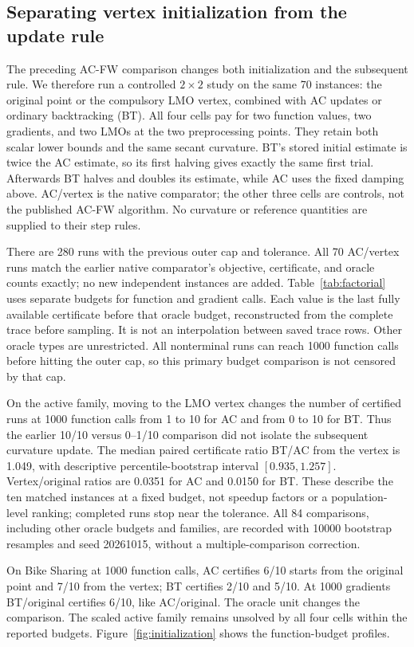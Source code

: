 \subsection{Separating vertex initialization from the update rule}
The preceding AC-FW comparison changes both initialization and the
subsequent rule. We therefore run a controlled $2\times2$ study on the
same 70 instances: the original point or the compulsory LMO vertex,
combined with AC updates or ordinary backtracking (BT). All four cells
pay for two function values, two gradients, and two LMOs at the two
preprocessing points. They retain both scalar lower bounds and the same
secant curvature. BT's stored initial estimate is twice the AC estimate,
so its first halving gives exactly the same first trial. Afterwards BT
halves and doubles its estimate, while AC uses the fixed damping above.
AC/vertex is the native comparator; the other three cells are controls,
not the published AC-FW algorithm. No curvature or reference quantities
are supplied to their step rules.

There are 280 runs with the previous outer cap and tolerance. All 70
AC/vertex runs match the earlier native comparator's objective,
certificate, and oracle counts exactly; no new independent instances
are added. Table~\ref{tab:factorial} uses separate budgets for function
and gradient calls. Each value is the last fully available certificate
before that oracle budget, reconstructed from the complete trace before
sampling. It is not an interpolation between saved trace rows. Other
oracle types are unrestricted. All nonterminal runs can reach 1000
function calls before hitting the outer cap, so this primary budget
comparison is not censored by that cap.

On the active family, moving to the LMO vertex changes the number of
certified runs at 1000 function calls from 1 to 10 for AC and from 0 to
10 for BT. Thus the earlier 10/10 versus 0--1/10 comparison did not
isolate the subsequent curvature update. The median paired certificate
ratio BT/AC from the vertex is 1.049, with descriptive percentile-bootstrap
interval $[0.935,1.257]$. Vertex/original ratios are 0.0351 for AC and
0.0150 for BT. These describe the ten matched instances at a fixed
budget, not speedup factors or a population-level ranking; completed
runs stop near the tolerance. All 84 comparisons, including other
oracle budgets and families, are recorded with 10000 bootstrap resamples
and seed 20261015, without a multiple-comparison correction.

On Bike Sharing at 1000 function calls, AC certifies 6/10 starts from the
original point and 7/10 from the vertex; BT certifies 2/10 and 5/10.
At 1000 gradients BT/original certifies 6/10, like AC/original. The oracle
unit changes the comparison. The scaled active family remains unsolved
by all four cells within the reported budgets. Figure~\ref{fig:initialization}
shows the function-budget profiles.

